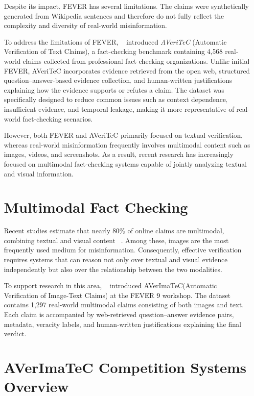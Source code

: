 Despite its impact, FEVER has several limitations. The claims were synthetically generated from Wikipedia sentences and therefore do not fully reflect the complexity and diversity of real-world misinformation.

To address the limitations of FEVER, ~\citet{Schlichtkrull2023May} introduced \textit{AVeriTeC} (Automatic Verification of Text Claims), a fact-checking benchmark containing 4,568 real-world claims collected from professional fact-checking organizations. Unlike initial FEVER, AVeriTeC incorporates evidence retrieved from the open web, structured question–answer-based evidence collection, and human-written justifications explaining how the evidence supports or refutes a claim. The dataset was specifically designed to reduce common issues such as context dependence, insufficient evidence, and temporal leakage, making it more representative of real-world fact-checking scenarios.

However, both FEVER and AVeriTeC primarily focused on textual verification, whereas real-world misinformation frequently involves multimodal content such as images, videos, and screenshots. As a result, recent research has increasingly focused on multimodal fact-checking systems capable of jointly analyzing textual and visual information.

\section{Multimodal Fact Checking}

Recent studies estimate that nearly 80\% of online claims are multimodal, combining textual and visual content ~\cite{Dufour2024May}. Among these, images are the most frequently used medium for misinformation. Consequently, effective verification requires systems that can reason not only over textual and visual evidence independently but also over the relationship between the two modalities.

To support research in this area, ~\citet{Cao2025May} introduced AVerImaTeC(Automatic Verification of Image-Text Claims) at the FEVER 9 workshop. The dataset contains 1,297 real-world multimodal claims consisting of both images and text. Each claim is accompanied by web-retrieved question–answer evidence pairs, metadata, veracity labels, and human-written justifications explaining the final verdict.

\section{AVerImaTeC  Competition Systems Overview}


